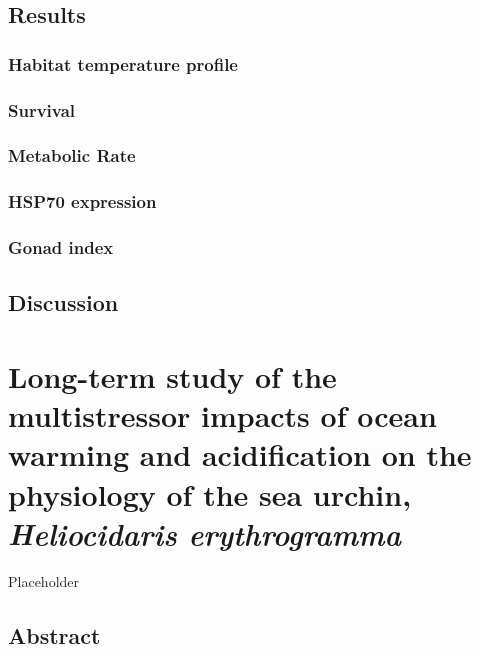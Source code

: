 \documentclass[
  oneside, 11pt, a4paper]{memoir}
\begin{document}
\hypertarget{results}{%
\section{Results}\label{results}}

\hypertarget{habitat-temperature-profile-1}{%
\subsection{Habitat temperature profile}\label{habitat-temperature-profile-1}}

\hypertarget{survival-1}{%
\subsection{Survival}\label{survival-1}}

\hypertarget{metabolic-rate-1}{%
\subsection{Metabolic Rate}\label{metabolic-rate-1}}

\hypertarget{hsp70-expression}{%
\subsection{HSP70 expression}\label{hsp70-expression}}

\hypertarget{gonad-index}{%
\subsection{Gonad index}\label{gonad-index}}

\hypertarget{discussion}{%
\section{Discussion}\label{discussion}}

\hypertarget{chapter3}{%
\chapter{\texorpdfstring{Long-term study of the multistressor impacts of ocean warming and acidification on the physiology of the sea urchin, \emph{Heliocidaris erythrogramma}}{Long-term study of the multistressor impacts of ocean warming and acidification on the physiology of the sea urchin, Heliocidaris erythrogramma}}\label{chapter3}}

Placeholder

\hypertarget{abstract-1}{%
\section*{Abstract}\label{abstract-1}}
\end{document}
